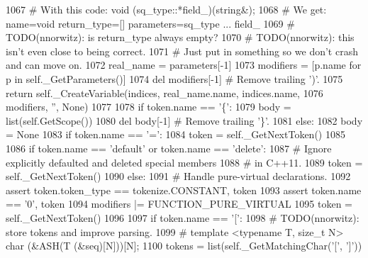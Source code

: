 \begin{DoxyCode}
1067             \textcolor{comment}{# With this code: void (sq\_type::*field\_)(string&);}
1068             \textcolor{comment}{# We get: name=void return\_type=[] parameters=sq\_type ... field\_}
1069             \textcolor{comment}{# TODO(nnorwitz): is return\_type always empty?}
1070             \textcolor{comment}{# TODO(nnorwitz): this isn't even close to being correct.}
1071             \textcolor{comment}{# Just put in something so we don't crash and can move on.}
1072             real\_name = parameters[-1]
1073             modifiers = [p.name \textcolor{keywordflow}{for} p \textcolor{keywordflow}{in} self.\_GetParameters()]
1074             del modifiers[-1]           \textcolor{comment}{# Remove trailing ')'.}
1075             \textcolor{keywordflow}{return} self.\_CreateVariable(indices, real\_name.name, indices.name,
1076                                         modifiers, \textcolor{stringliteral}{''}, \textcolor{keywordtype}{None})
1077 
1078         \textcolor{keywordflow}{if} token.name == \textcolor{stringliteral}{'\{'}:
1079             body = list(self.GetScope())
1080             del body[-1]                \textcolor{comment}{# Remove trailing '\}'.}
1081         \textcolor{keywordflow}{else}:
1082             body = \textcolor{keywordtype}{None}
1083             \textcolor{keywordflow}{if} token.name == \textcolor{stringliteral}{'='}:
1084                 token = self.\_GetNextToken()
1085 
1086                 \textcolor{keywordflow}{if} token.name == \textcolor{stringliteral}{'default'} \textcolor{keywordflow}{or} token.name == \textcolor{stringliteral}{'delete'}:
1087                     \textcolor{comment}{# Ignore explicitly defaulted and deleted special members}
1088                     \textcolor{comment}{# in C++11.}
1089                     token = self.\_GetNextToken()
1090                 \textcolor{keywordflow}{else}:
1091                     \textcolor{comment}{# Handle pure-virtual declarations.}
1092                     \textcolor{keyword}{assert} token.token\_type == tokenize.CONSTANT, token
1093                     \textcolor{keyword}{assert} token.name == \textcolor{stringliteral}{'0'}, token
1094                     modifiers |= FUNCTION\_PURE\_VIRTUAL
1095                     token = self.\_GetNextToken()
1096 
1097             \textcolor{keywordflow}{if} token.name == \textcolor{stringliteral}{'['}:
1098                 \textcolor{comment}{# TODO(nnorwitz): store tokens and improve parsing.}
1099                 \textcolor{comment}{# template <typename T, size\_t N> char (&ASH(T (&seq)[N]))[N];}
1100                 tokens = list(self.\_GetMatchingChar(\textcolor{stringliteral}{'['}, \textcolor{stringliteral}{']'}))

\end{DoxyCode}
